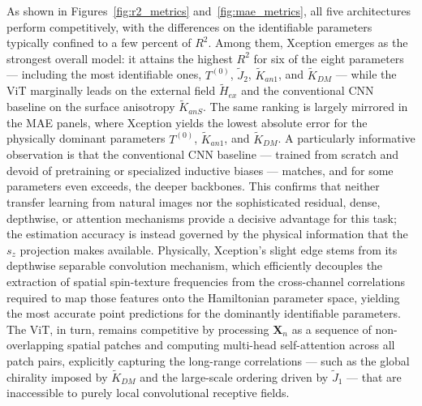 \documentclass[letterpaper, 12, one column]{article}
\begin{document}
As shown in Figures~\ref{fig:r2_metrics} and~\ref{fig:mae_metrics}, all
five architectures perform competitively, with the differences on the
identifiable parameters typically confined to a few percent of $R^2$.
Among them, Xception emerges as the strongest overall model: it attains
the highest $R^2$ for six of the eight parameters --- including the
most identifiable ones, $T^{(0)}$, $\tilde{J}_2$, $\tilde{K}_{an1}$,
and $\tilde{K}_{DM}$ --- while the ViT marginally leads on the external
field $\tilde{H}_{ex}$ and the conventional CNN baseline on the surface
anisotropy $\tilde{K}_{anS}$. The same ranking is largely mirrored in
the MAE panels, where Xception yields the lowest absolute error for the
physically dominant parameters $T^{(0)}$, $\tilde{K}_{an1}$, and
$\tilde{K}_{DM}$. A particularly informative observation is that the
conventional CNN baseline --- trained from scratch and devoid of
pretraining or specialized inductive biases --- matches, and for some
parameters even exceeds, the deeper backbones. This confirms that
neither transfer learning from natural images nor the sophisticated
residual, dense, depthwise, or attention mechanisms provide a decisive
advantage for this task; the estimation accuracy is instead governed by
the physical information that the $s_z$ projection makes available.
Physically, Xception's slight edge stems from its depthwise separable
convolution mechanism, which efficiently decouples the extraction of
spatial spin-texture frequencies from the cross-channel correlations
required to map those features onto the Hamiltonian parameter space,
yielding the most accurate point predictions for the dominantly
identifiable parameters. The ViT, in turn, remains competitive by
processing $\mathbf{X}_n$ as a sequence of non-overlapping spatial
patches and computing multi-head self-attention across all patch pairs,
explicitly capturing the long-range correlations --- such as the global
chirality imposed by $\tilde{K}_{DM}$ and the large-scale ordering
driven by $\tilde{J}_1$ --- that are inaccessible to purely local
convolutional receptive fields.
\end{document}
